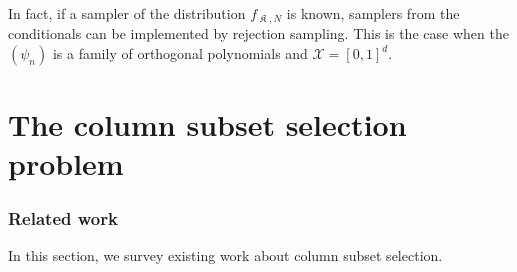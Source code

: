 \documentclass[twoside,11pt]{book}
\DeclareMathOperator*{\KDPP}{\mathfrak{K}}
\begin{document}
In fact, if a sampler of the distribution $f_{\KDPP,N}$ is known, samplers from the conditionals can be implemented by rejection sampling. This is the case when the $(\psi_{n})$ is a family of orthogonal polynomials and $\mathcal{X} = [0,1]^{d}$.  

\clearpage
\chapter{The column subset selection problem}\label{chapter:cssp}
\subsection{Related work}

In this section, we survey existing work about column subset selection.
\end{document}

